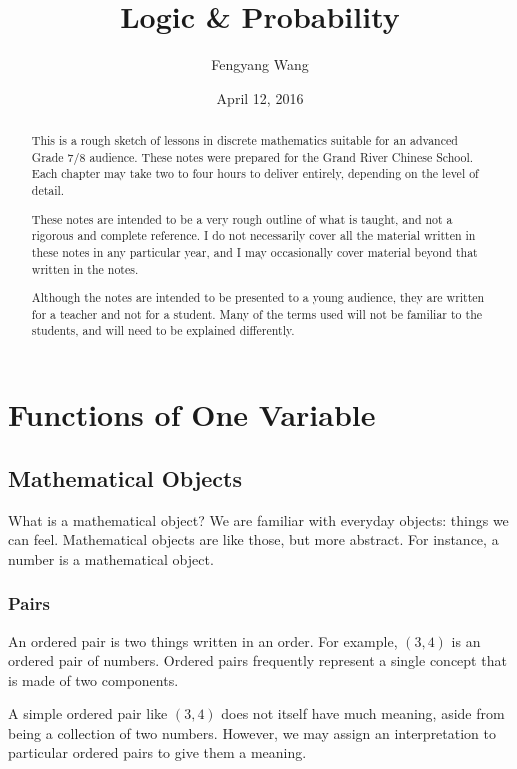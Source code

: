 \documentclass[a4paper,10pt]{report}
\title{Logic \& Probability}
\author{Fengyang Wang}
\date{April 12, 2016}
\begin{document}
\begin{abstract}

 This is a rough sketch of lessons in discrete mathematics suitable for an
 advanced Grade 7/8 audience. These notes were prepared for the Grand River
 Chinese School. Each chapter may take two to four hours to deliver entirely,
 depending on the level of detail.

 These notes are intended to be a very rough outline of what is taught, and not
 a rigorous and complete reference. I do not necessarily cover all the material
 written in these notes in any particular year, and I may occasionally cover
 material beyond that written in the notes.

 Although the notes are intended to be presented to a young audience, they are
 written for a teacher and not for a student. Many of the terms used will not be
 familiar to the students, and will need to be explained differently.

\end{abstract}

\maketitle

\tableofcontents

\chapter{Functions of One Variable}

\section{Mathematical Objects}

What is a mathematical object? We are familiar with everyday objects: things we can feel.
Mathematical objects are like those, but more abstract. For instance, a number is a
mathematical object.

\subsection{Pairs}

An \gls{ordered pair} is two things written in an order. For example, \((3,
4)\) is an ordered pair of numbers. Ordered pairs frequently represent a single
concept that is made of two components.

A simple ordered pair like \((3, 4)\) does not itself have much meaning, aside
from being a collection of two numbers. However, we may assign an
interpretation to particular ordered pairs to give them a meaning.
\end{document}
